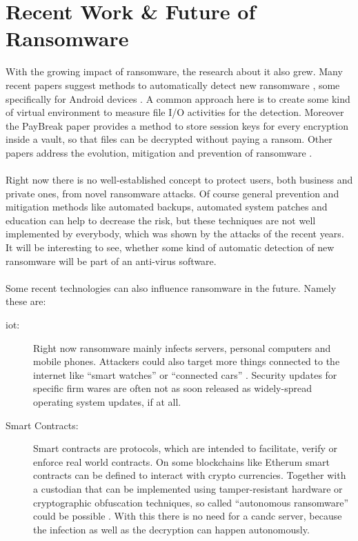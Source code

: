 \section{Recent Work \& Future of Ransomware}

With the growing impact of ransomware, the research about it also grew. Many recent papers suggest methods to automatically detect new ransomware \cite{Kolodenker2017}\cite{Kirda2017}\cite{Continella2016}\cite{Moore2016}\cite{Ahmadian2016}\cite{Shukla2016}, some specifically for Android devices \cite{Maiorca2017}\cite{Andronio2015}\cite{Yang2015}. A common approach here is to create some kind of virtual environment to measure file I/O activities for the detection. Moreover the PayBreak paper \cite{Kolodenker2017} provides a method to store session keys for every encryption inside a vault, so that files can be decrypted without paying a ransom. Other papers address the evolution, mitigation and prevention of ransomware \cite{Gupta2017}\cite{Richardson2017}\cite{Shinde2016}\cite{Nagpal2016}\cite{Zavarsky2016}.\\
\\
Right now there is no well-established concept to protect users, both business and private ones, from novel ransomware attacks. Of course general prevention and mitigation methods like automated backups, automated system patches and education can help to decrease the risk, but these techniques are not well implemented by everybody, which was shown by the attacks of the recent years. It will be interesting to see, whether some kind of automatic detection of new ransomware will be part of an anti-virus software. \\
\\
Some recent technologies can also influence ransomware in the future. Namely these are:

\begin{description}
\item[\gls{iot}:] Right now ransomware mainly infects servers, personal computers and mobile phones. Attackers could also target more things connected to the internet like ``smart watches'' or ``connected cars'' \cite{Cobb2017}. Security updates for specific firm wares are often not as soon released as widely-spread operating system updates, if at all.
\item[Smart Contracts:] Smart contracts are protocols, which are intended to facilitate, verify or enforce real world contracts. On some blockchains like Etherum smart contracts can be defined to interact with crypto currencies. Together with a custodian that can be implemented using tamper-resistant hardware or cryptographic obfuscation techniques, so called ``autonomous ransomware'' could be possible \cite{Kaptchuk2017}\cite{Juels2016}. With this there is no need for a \gls{candc} server, because the infection as well as the decryption can happen autonomously.
\end{description} 

